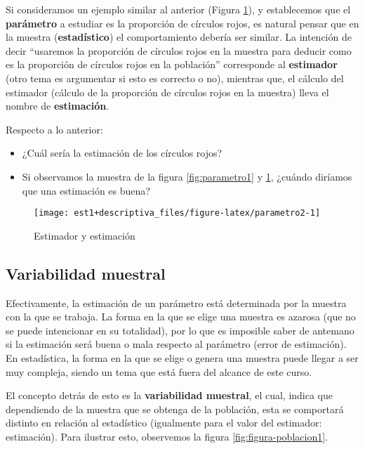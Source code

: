 \documentclass[
]{book}
\providecommand{\tightlist}{%
  \setlength{\itemsep}{0pt}\setlength{\parskip}{0pt}}
\begin{document}
Si consideramos un ejemplo similar al anterior (Figura \ref{fig:parametro2}), y establecemos que el \textbf{parámetro} a estudiar es la proporción de círculos rojos, es natural pensar que en la muestra (\textbf{estadístico}) el comportamiento debería ser similar. La intención de decir ``usaremos la proporción de círculos rojos en la muestra para deducir como es la proporción de círculos rojos en la población'' corresponde al \textbf{estimador} (otro tema es argumentar si esto es correcto o no), mientras que, el cálculo del estimador (cálculo de la proporción de círculos rojos en la muestra) lleva el nombre de \textbf{estimación}.

Respecto a lo anterior:

\begin{itemize}
\tightlist
\item
  ¿Cuál sería la estimación de los círculos rojos?
\item
  Si observamos la muestra de la figura \ref{fig:parametro1} y \ref{fig:parametro2}, ¿cuándo diríamos que una estimación es buena?
\end{itemize}

\begin{figure}

{\centering \texttt{[image: est1+descriptiva\_files/figure-latex/parametro2-1]} 

}

\caption{Estimador y estimación}\label{fig:parametro2}
\end{figure}

\hypertarget{variabilidad-muestral}{%
\subsection{Variabilidad muestral}\label{variabilidad-muestral}}

Efectivamente, la estimación de un parámetro está determinada por la muestra con la que se trabaja. La forma en la que se elige una muestra es azarosa (que no se puede intencionar en su totalidad), por lo que es imposible saber de antemano si la estimación será buena o mala respecto al parámetro (error de estimación). En estadística, la forma en la que se elige o genera una muestra puede llegar a ser muy compleja, siendo un tema que está fuera del alcance de este curso.

El concepto detrás de esto es la \textbf{variabilidad muestral}, el cual, indica que dependiendo de la muestra que se obtenga de la población, esta se comportará distinto en relación al estadístico (igualmente para el valor del estimador: estimación). Para ilustrar esto, observemos la figura \ref{fig:figura-poblacion1}.
\end{document}
